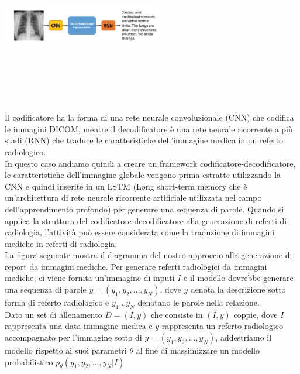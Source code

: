 \documentclass[12pt,a4paper]{report}
\begin{document}
\begin{center}
\includegraphics[width=7cm,height=7cm,keepaspectratio]{Encoder-Decoder}
\end{center}

Il codificatore ha la forma di una rete neurale convoluzionale (CNN) che codifica le immagini DICOM, mentre il decodificatore è una rete neurale ricorrente a più stadi (RNN) che traduce le caratteristiche dell'immagine medica in un referto radiologico.\\
In questo caso andiamo quindi a creare un framework codificatore-decodificatore, le caratteristiche dell'immagine globale vengono prima estratte utilizzando la CNN e quindi inserite in un LSTM (Long short-term memory che è un'architettura di rete neurale ricorrente artificiale utilizzata nel campo dell'apprendimento profondo) per generare una sequenza di parole. Quando si applica la struttura del codificatore-decodificatore alla generazione di referti di radiologia, l'attività può essere considerata come la traduzione di immagini mediche in referti di radiologia.\\
La figura seguente mostra il diagramma del nostro approccio alla generazione di report da immagini mediche. Per generare referti radiologici da immagini mediche, ci viene fornita un'immagine di inputi $I$ e il modello dovrebbe generare una sequenza di parole $y = (y_1, y_2, . . . ,y_N)$, dove $y$ denota la descrizione sotto forma di referto radiologico e $y_1 . . .y_N$ denotano le parole nella relazione.\\
Dato un set di allenamento $D = (I, y)$ che consiste in $(I, y)$ coppie, dove $I$ rappresenta una data immagine medica e $y$ rappresenta un referto radiologico accompagnato per l'immagine sotto di $y = (y_1, y_2, . . . ,y_N)$, addestriamo il modello rispetto ai suoi parametri $\theta$ al fine di massimizzare un modello probabilistico $p_{\theta}(y_1, y_2, . . . , y_N|I)$
\end{document}
